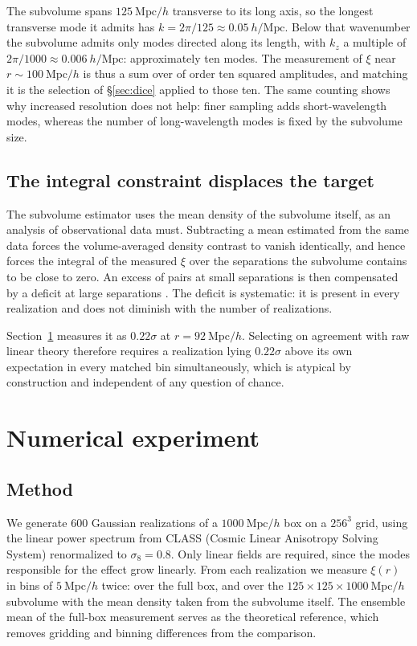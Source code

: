 \documentclass[12pt]{article}
\newcommand{\Mpch}{\ \mathrm{Mpc}/h}
\begin{document}
The subvolume spans $125\Mpch$ transverse to its long axis, so the longest
transverse mode it admits has $k = 2\pi/125 \approx 0.05\ h/\mathrm{Mpc}$.
Below that wavenumber the subvolume admits only modes directed along its
length, with $k_z$ a multiple of $2\pi/1000 \approx 0.006\ h/\mathrm{Mpc}$:
approximately ten modes.  The measurement of $\xi$ near $r \sim 100\Mpch$ is
thus a sum over of order ten squared amplitudes, and matching it is the
selection of \S\ref{sec:dice} applied to those ten.  The same counting shows
why increased resolution does not help: finer sampling adds short-wavelength
modes, whereas the number of long-wavelength modes is fixed by the subvolume
size.

\subsection{The integral constraint displaces the target}\label{sec:target}

The subvolume estimator uses the mean density of the subvolume itself, as an
analysis of observational data must.  Subtracting a mean estimated from the
same data forces the volume-averaged density contrast to vanish identically,
and hence forces the integral of the measured $\xi$ over the separations the
subvolume contains to be close to zero.  An excess of pairs at small
separations is then compensated by a deficit at large separations
\citep{Peebles1980}.  The deficit is systematic: it is present in every
realization and does not diminish with the number of realizations.

Section~\ref{sec:experiment} measures it as $0.22\sigma$ at $r = 92\Mpch$.
Selecting on agreement with raw linear theory therefore requires a realization
lying $0.22\sigma$ above its own expectation in every matched bin
simultaneously, which is atypical by construction and independent of any
question of chance.

\section{Numerical experiment}\label{sec:experiment}

\subsection{Method}\label{sec:method}

We generate 600 Gaussian realizations of a $1000\Mpch$ box on a $256^3$ grid,
using the linear power spectrum from CLASS (Cosmic Linear Anisotropy Solving
System) renormalized to $\sigma_8 = 0.8$.  Only linear fields are required,
since the modes responsible for the effect grow linearly.  From each
realization we measure $\xi(r)$ in bins of $5\Mpch$ twice: over the full box,
and over the $125 \times 125 \times 1000\Mpch$ subvolume with the mean density
taken from the subvolume itself.  The ensemble mean of the full-box measurement
serves as the theoretical reference, which removes gridding and binning
differences from the comparison.
\end{document}
